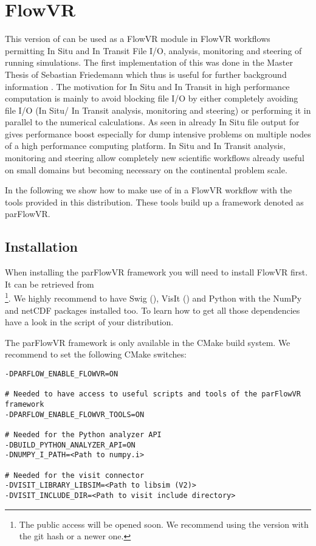\chapter{FlowVR}
\label{FlowVR}

This version of \parflow{} can be used as a FlowVR module in FlowVR workflows
\cite{dreherflexible2014}
permitting
In Situ and In Transit File I/O, analysis, monitoring and steering of running simulations.
The first implementation of this was done in the Master Thesis of Sebastian Friedemann
which thus is useful for further background information \cite{thesisFriedemann2018}.
The motivation for In Situ and In Transit in high performance computation is mainly to avoid
blocking file I/O by either completely avoiding file I/O (In Situ/ In Transit analysis,
monitoring and steering) or performing it in parallel to the numerical calculations.
As seen in \cite{thesisFriedemann2018} already In Situ file output for \parflow{} gives performance
boost especially
for dump intensive problems on multiple nodes of a high performance computing platform.
In Situ and In Transit analysis, monitoring and steering allow completely new scientific
workflows already useful on small domains but becoming necessary on the continental problem
scale.

In the following we show how to make use of \parflow{} in a FlowVR workflow with the tools
provided in this \parflow{} distribution. These tools build up a framework denoted as
parFlowVR.

\section{Installation}
When installing the parFlowVR framework you will need to install
FlowVR first.
It can be retrieved from \\%
\footnote{The public access will be opened soon. We recommend using the version
with the git hash  or a newer one.}.
We highly recommend to have Swig (),
VisIt () and
Python with the NumPy and netCDF packages installed too. To learn how to get all those
dependencies have a look in the  script of your \parflow{} distribution.

The parFlowVR framework is only available in the CMake build system. We recommend to set the following
CMake switches:
\begin{display}\begin{verbatim}
-DPARFLOW_ENABLE_FLOWVR=ON

# Needed to have access to useful scripts and tools of the parFlowVR framework
-DPARFLOW_ENABLE_FLOWVR_TOOLS=ON

# Needed for the Python analyzer API
-DBUILD_PYTHON_ANALYZER_API=ON
-DNUMPY_I_PATH=<Path to numpy.i>

# Needed for the visit connector
-DVISIT_LIBRARY_LIBSIM=<Path to libsim (V2)>
-DVISIT_INCLUDE_DIR=<Path to visit include directory>

\end{verbatim}\end{display}

